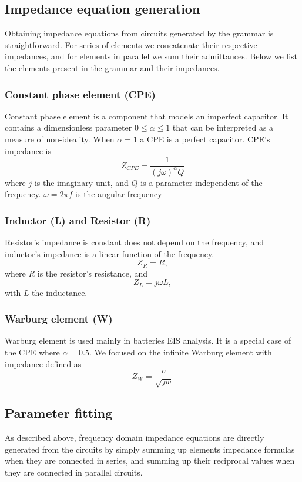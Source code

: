 \documentclass[
    11pt,
    a4paper,
    oneside
]{article}
\begin{document}
\subsection{Impedance equation generation}

Obtaining impedance equations from circuits generated by the grammar is straightforward. For series of elements we concatenate their
respective impedances, and for elements in parallel we sum their admittances. Below we list the elements present in the grammar and their impedances.

\subsubsection*{Constant phase element (CPE)}
Constant phase element is a component that models an imperfect capacitor. It contains a dimensionless parameter $0\le\alpha\leq1$ that can be
interpreted as a measure of non-ideality. When $\alpha=1$ a CPE is a perfect capacitor.
CPE's impedance is
\[
    Z_{CPE} = \frac{1}{(j\omega)^{\alpha}Q}
\]
where $j$ is the imaginary unit, and $Q$ is a parameter independent of the frequency. $\omega=2\pi f$ is the angular frequency
\subsubsection*{Inductor (L) and Resistor (R)}

Resistor's impedance is constant does not depend on the frequency, and inductor's impedance is a linear function of the frequency. 
$$Z_R = R,$$
where $R$ is the resistor's resistance, and
\[
    Z_L = j\omega L,
\]
with $L$ the inductance.
\subsubsection*{Warburg element (W)}
Warburg element is used mainly in batteries EIS analysis. It is a special case of the CPE where $\alpha=0.5$. We focused on the infinite Warburg
element with impedance defined as
\[
    Z_W = \frac{\sigma}{\sqrt{jw}}
\]
\subsection{Parameter fitting}
As described above, frequency domain impedance equations are directly generated from the circuits by simply summing up elements
impedance formulas when they are connected in series, and summing up their reciprocal values when they are connected in parallel circuits.
\end{document}
